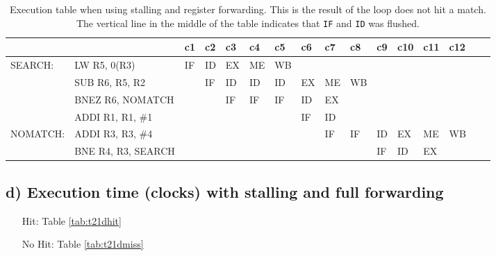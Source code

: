 \begin{landscape}
    \begin{table}[]
    \centering
    \begin{tabular}{llllllllllllllll}
    \hline
             &                                         & c1 & c2 & c3 & c4 & c5 & c6 & c7                      & c8 & c9 & c10 & c11 & c12 \\ \hline
    SEARCH:  & \multicolumn{1}{l|}{LW R5, 0(R3)}       & IF & ID & EX & ME & WB &    &                         &    &    &     &     &     \\
             & \multicolumn{1}{l|}{SUB R6, R5, R2}     &    & IF & ID & ID & ID & EX & ME                      & WB &    &     &     &     \\
             & \multicolumn{1}{l|}{BNEZ R6, NOMATCH}   &    &    & IF & IF & IF & ID & EX                      &    &    &     &     &     \\
             & \multicolumn{1}{l|}{ADDI R1, R1, \#1}   &    &    &    &    &    & IF & \multicolumn{1}{l|}{ID} &    &    &     &     &     \\
    NOMATCH: & \multicolumn{1}{l|}{ADDI R3, R3, \#4}   &    &    &    &    &    &    & \multicolumn{1}{l|}{IF} & IF & ID & EX  & ME  & WB  \\
             & \multicolumn{1}{l|}{BNE R4, R3, SEARCH} &    &    &    &    &    &    &                         &    & IF & ID  & EX  &     \\ \hline
    \end{tabular}
    \caption{Execution table when using stalling and register forwarding. This is the result of the loop does not hit a match. The vertical line in the middle of the table indicates that \texttt{IF} and \texttt{ID} was flushed.}
    \label{tab:t21cmiss}
    \end{table}

\end{landscape}




\subsection{d) Execution time (clocks) with stalling and full forwarding}
\begin{itemize}
    \item[Hit: ] Table \ref{tab:t21dhit}

    \item[No Hit: ] Table \ref{tab:t21dmiss}
\end{itemize}

